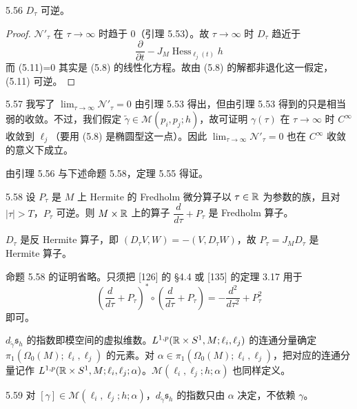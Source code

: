 \begin{lemma*}{5.56}
  $D_\tau$ 可逆。
\end{lemma*}

\begin{proof}
  $\mathcal{N}'_\tau$ 在 $\tau\to\infty$ 时趋于 0（引理 5.53）。故 $\tau\to\infty$ 时 $D_\tau$ 趋近于
  \begin{equation}
    \frac{\partial}{\partial t}-J_M\operatorname{Hess}_{\ell_j(t)}h \tag{5.11}
  \end{equation}
  而 (5.11)=0 其实是 (5.8) 的线性化方程。故由 (5.8) 的解都非退化这一假定，(5.11) 可逆。
\end{proof}

\begin{remark}{5.57}
  我写了 $\lim_{\tau\to\infty}\mathcal{N}'_\tau=0$ 由引理 5.53 得出，但由引理 5.53 得到的只是相当弱的收敛。不过，我们假定 $\tilde\gamma\in\mathcal{M}(p_i,p_j;h)$，故可证明 $\gamma(\tau)$ 在 $\tau\to\infty$ 时 $C^\infty$ 收敛到 $\ell_j$（要用 (5.8) 是椭圆型这一点）。因此 $\lim_{\tau\to\infty}\mathcal{N}'_\tau=0$ 也在 $C^\infty$ 收敛的意义下成立。
\end{remark}

由引理 5.56 与下述命题 5.58，定理 5.55 得证。

\begin{proposition}{5.58}
  设 $P_\tau$ 是 $M$ 上 Hermite 的 Fredholm 微分算子以 $\tau\in\mathbb{R}$ 为参数的族，且对 $|\tau|>T$，$P_\tau$ 可逆。则 $M\times\mathbb{R}$ 上的算子 $\dfrac{d}{d\tau}+P_\tau$ 是 Fredholm 算子。
\end{proposition}

$D_\tau$ 是反 Hermite 算子，即 $(D_\tau V,W)=-(V,D_\tau W)$，故 $P_\tau=J_MD_\tau$ 是 Hermite 算子。

命题 5.58 的证明省略。只须把 [126] 的 §4.4 或 [135] 的定理 3.17 用于
\[
  \left(\frac{d}{d\tau}+P_\tau\right)^*\circ\left(\frac{d}{d\tau}+P_\tau\right)
  =-\frac{d^2}{d\tau^2}+P_\tau^2
\]
即可。

$d_{\tilde\gamma}\mathfrak{s}_h$ 的指数即模空间的虚拟维数。$L^{1,p}(\mathbb{R}\times S^1,M;\ell_i,\ell_j)$ 的连通分量确定 $\pi_1(\Omega_0(M);\ell_i,\ell_j)$ 的元素。对 $\alpha\in\pi_1(\Omega_0(M);\ell_i,\ell_j)$，把对应的连通分量记作 $L^{1,p}(\mathbb{R}\times S^1,M;\ell_i,\ell_j;\alpha)$。$\mathcal{M}(\ell_i,\ell_j;h;\alpha)$ 也同样定义。

\begin{lemma*}{5.59}
  对 $[\gamma]\in\mathcal{M}(\ell_i,\ell_j;h;\alpha)$，$d_{\tilde\gamma}\mathfrak{s}_h$ 的指数只由 $\alpha$ 决定，不依赖 $\gamma$。
\end{lemma*}

